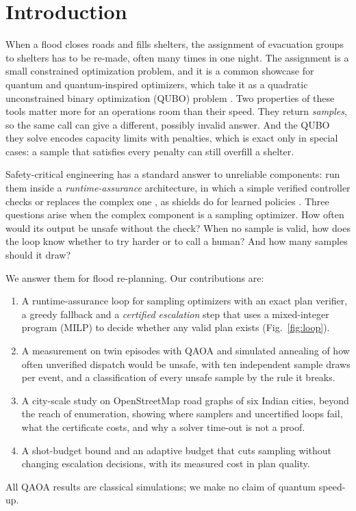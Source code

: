 \documentclass[conference]{IEEEtran}
\begin{document}
\section{Introduction}
When a flood closes roads and fills shelters, the assignment of evacuation groups to shelters has to be re-made, often many times in one night. The assignment is a small constrained optimization problem, and it is a common showcase for quantum and quantum-inspired optimizers, which take it as a quadratic unconstrained binary optimization (QUBO) problem \cite{Lucas2014,Glover2019,Cadelina2024,Abbas2024}. Two properties of these tools matter more for an operations room than their speed. They return \emph{samples}, so the same call can give a different, possibly invalid answer. And the QUBO they solve encodes capacity limits with penalties, which is exact only in special cases: a sample that satisfies every penalty can still overfill a shelter.

Safety-critical engineering has a standard answer to unreliable components: run them inside a \emph{runtime-assurance} architecture, in which a simple verified controller checks or replaces the complex one \cite{Sha2001,Desai2019}, as shields do for learned policies \cite{Alshiekh2018}. Three questions arise when the complex component is a sampling optimizer. How often would its output be unsafe without the check? When no sample is valid, how does the loop know whether to try harder or to call a human? And how many samples should it draw?

We answer them for flood re-planning. Our contributions are:
\begin{enumerate}
\item A runtime-assurance loop for sampling optimizers with an exact plan verifier, a greedy fallback and a \emph{certified escalation} step that uses a mixed-integer program (MILP) to decide whether any valid plan exists (Fig.~\ref{fig:loop}).
\item A measurement on twin episodes with QAOA \cite{Farhi2014,Hadfield2019} and simulated annealing \cite{Kirkpatrick1983} of how often unverified dispatch would be unsafe, with ten independent sample draws per event, and a classification of every unsafe sample by the rule it breaks.
\item A city-scale study on OpenStreetMap road graphs of six Indian cities, beyond the reach of enumeration, showing where samplers and uncertified loops fail, what the certificate costs, and why a solver time-out is not a proof.
\item A shot-budget bound and an adaptive budget that cuts sampling without changing escalation decisions, with its measured cost in plan quality.
\end{enumerate}
All QAOA results are classical simulations; we make no claim of quantum speed-up.
\end{document}
